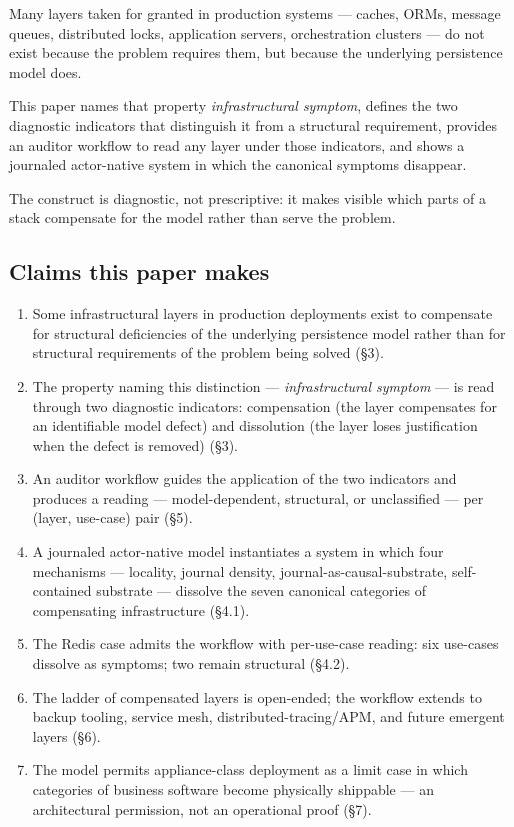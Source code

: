 \documentclass[
]{article}
\providecommand{\tightlist}{%
  \setlength{\itemsep}{0pt}\setlength{\parskip}{0pt}}
\begin{document}
Many layers taken for granted in production systems --- caches, ORMs,
message queues, distributed locks, application servers, orchestration
clusters --- do not exist because the problem requires them, but because
the underlying persistence model does.

This paper names that property \emph{infrastructural symptom}, defines
the two diagnostic indicators that distinguish it from a structural
requirement, provides an auditor workflow to read any layer under those
indicators, and shows a journaled actor-native system in which the
canonical symptoms disappear.

The construct is diagnostic, not prescriptive: it makes visible which
parts of a stack compensate for the model rather than serve the problem.

\subsection{Claims this paper makes}\label{claims-this-paper-makes}

\begin{enumerate}
\def\labelenumi{\arabic{enumi}.}
\tightlist
\item
  Some infrastructural layers in production deployments exist to
  compensate for structural deficiencies of the underlying persistence
  model rather than for structural requirements of the problem being
  solved (§3).
\item
  The property naming this distinction --- \emph{infrastructural
  symptom} --- is read through two diagnostic indicators: compensation
  (the layer compensates for an identifiable model defect) and
  dissolution (the layer loses justification when the defect is removed)
  (§3).
\item
  An auditor workflow guides the application of the two indicators and
  produces a reading --- model-dependent, structural, or unclassified
  --- per (layer, use-case) pair (§5).
\item
  A journaled actor-native model instantiates a system in which four
  mechanisms --- locality, journal density, journal-as-causal-substrate,
  self-contained substrate --- dissolve the seven canonical categories
  of compensating infrastructure (§4.1).
\item
  The Redis case admits the workflow with per-use-case reading: six
  use-cases dissolve as symptoms; two remain structural (§4.2).
\item
  The ladder of compensated layers is open-ended; the workflow extends
  to backup tooling, service mesh, distributed-tracing/APM, and future
  emergent layers (§6).
\item
  The model permits appliance-class deployment as a limit case in which
  categories of business software become physically shippable --- an
  architectural permission, not an operational proof (§7).
\end{enumerate}
\end{document}
